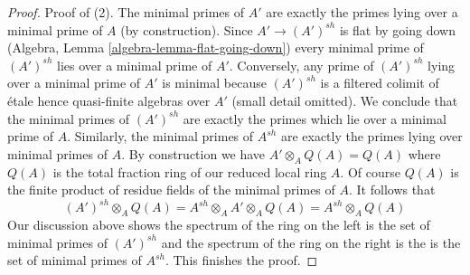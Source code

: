 \documentclass[10pt,a4paper]{amsart}
\theoremstyle{plain}
\theoremstyle{definition}
\theoremstyle{remark}
\numberwithin{equation}{subsection}
\begin{document}
\begin{proof}
\medskip\noindent
Proof of (2). The minimal primes of $A'$ are exactly the primes
lying over a minimal prime of $A$ (by construction).
Since $A' \to (A')^{sh}$ is flat by going down
(Algebra, Lemma \ref{algebra-lemma-flat-going-down})
every minimal prime of $(A')^{sh}$ lies over a minimal prime
of $A'$. Conversely, any prime of $(A')^{sh}$ lying over a
minimal prime of $A'$ is minimal because $(A')^{sh}$ is a filtered
colimit of \'etale hence quasi-finite algebras over $A'$ (small detail omitted).
We conclude that the minimal primes of $(A')^{sh}$
are exactly the primes which lie over a minimal prime of $A$.
Similarly, the minimal primes of $A^{sh}$ are exactly the
primes lying over minimal primes of $A$.
By construction we have $A' \otimes_A Q(A) = Q(A)$ where $Q(A)$
is the total fraction ring of our reduced local ring $A$.
Of course $Q(A)$ is the finite product of residue fields of
the minimal primes of $A$. It follows that
$$
(A')^{sh} \otimes_A Q(A) =
A^{sh} \otimes_A A' \otimes_A Q(A) = A^{sh} \otimes_A Q(A)
$$
Our discussion above shows the spectrum of the ring
on the left is the set of minimal primes of $(A')^{sh}$
and the spectrum of the ring on the right is the
is the set of minimal primes of $A^{sh}$. This finishes the proof.
\end{proof}
\end{document}
